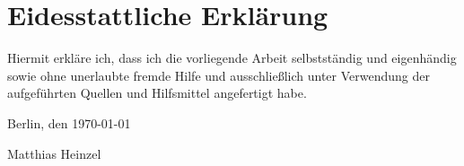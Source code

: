 \chapter*{Eidesstattliche Erklärung}

Hiermit erkläre ich,
dass ich die vorliegende Arbeit selbstständig und eigenhändig
sowie ohne unerlaubte fremde Hilfe
und ausschließlich unter Verwendung der aufgeführten Quellen und Hilfsmittel
angefertigt habe.

\vspace{1cm}
Berlin, den \today

\vspace{1cm}
Matthias Heinzel
